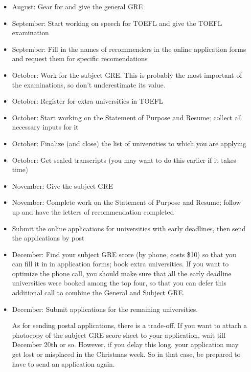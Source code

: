 \documentclass[a4paper]{amsart}
\begin{document}
\begin{itemize}
\item August: Gear for and give the general GRE

\item September: Start working on speech for TOEFL and give the TOEFL
  examination

\item September: Fill in the names of recommenders in the online application
  forms and request them for specific recomendations

\item October: Work for the subject GRE. This is probably the most important
  of the examinations, so don't underestimate its value.

\item October: Register for extra universities in TOEFL

\item October: Start working on the Statement of Purpose and Resume;
  collect all necessary inputs for it

\item October: Finalize (and close) the list of universities to which
  you are applying

\item October: Get sealed transcripts (you may want to do this earlier
  if it takes time)

\item November: Give the subject GRE

\item November: Complete work on the Statement of Purpose and Resume;
  follow up and have the letters of recommendation completed

\item Submit the online applications for universities with early deadlines,
  then send the applications by post

\item December: Find your subject GRE score (by phone, costs \$10) so
  that you can fill it in in application forms; book extra
  universities.  If you want to optimize the phone call, you should
  make sure that all the early deadline universities were booked among
  the top four, so that you can defer this additional call to combine
  the General and Subject GRE.

\item December: Submit applications for the remaining universities.

  As for sending postal applications, there is a trade-off. If you
  want to attach a photocopy of the subject GRE score sheet to your
  application, wait till December 20th or so. However, if you delay
  this long, your application may get lost or misplaced in the
  Christmas week. So in that case, be prepared to have to send an
  application again.

\end{itemize}





\printindex
\end{document}
